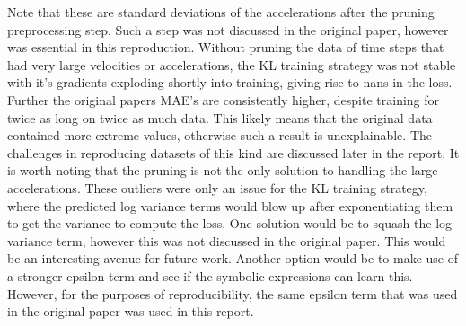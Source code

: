 \documentclass[11pt]{article}
\begin{document}
    Note that these are standard deviations of the accelerations after the pruning preprocessing step. Such a step was not discussed in the original paper, however was essential in this reproduction. Without pruning the data of time steps that had very large velocities or accelerations, the KL training strategy was not stable with it's gradients exploding shortly into training, giving rise to nans in the loss. Further the original papers MAE's are consistently higher, despite training for twice as long on twice as much data. This likely means that the original data contained more extreme values, otherwise such a result is unexplainable. The challenges in reproducing datasets of this kind are discussed later in the report. It is worth noting that the pruning is not the only solution to handling the large accelerations. These outliers were only an issue for the KL training strategy, where the predicted log variance terms would blow up after exponentiating them to get the variance to compute the loss. One solution would be to squash the log variance term, however this was not discussed in the original paper. This would be an interesting avenue for future work. Another option would be to make use of a stronger epsilon term and see if the symbolic expressions can learn this. However, for the purposes of reproducibility, the same epsilon term that was used in the original paper was used in this report.


    

    
\end{document}
